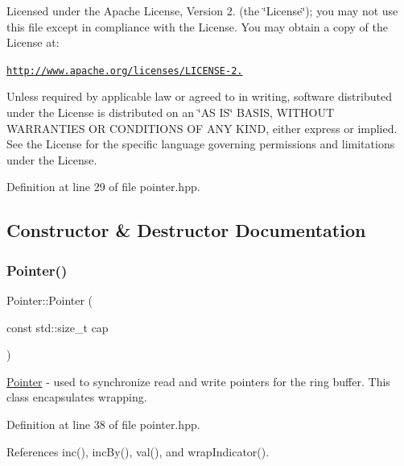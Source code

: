 Licensed under the Apache License, Version 2. (the \char`\"{}\+License\char`\"{}); you may not use this file except in compliance with the License. You may obtain a copy of the License at\+:

\href{http://www.apache.org/licenses/LICENSE-2.0}{\tt http\+://www.\+apache.\+org/licenses/\+L\+I\+C\+E\+N\+S\+E-\/2.}

Unless required by applicable law or agreed to in writing, software distributed under the License is distributed on an \char`\"{}\+A\+S I\+S\char`\"{} B\+A\+S\+IS, W\+I\+T\+H\+O\+UT W\+A\+R\+R\+A\+N\+T\+I\+ES OR C\+O\+N\+D\+I\+T\+I\+O\+NS OF A\+NY K\+I\+ND, either express or implied. See the License for the specific language governing permissions and limitations under the License. 

Definition at line 29 of file pointer.\+hpp.



\subsection{Constructor \& Destructor Documentation}
\hypertarget{class_pointer_ae124185327ebd4938437141a6aec7ede}{}\label{class_pointer_ae124185327ebd4938437141a6aec7ede} 
\subsubsection{\texorpdfstring{Pointer()}{Pointer()}\hspace{0.1cm}{\footnotesize\ttfamily [1/2]}}
{\footnotesize\ttfamily Pointer\+::\+Pointer (\begin{DoxyParamCaption}\item[{const std\+::size\+\_\+t}]{cap }\end{DoxyParamCaption})\hspace{0.3cm}{\ttfamily [inline]}}

\hyperlink{class_pointer}{Pointer} -\/ used to synchronize read and write pointers for the ring buffer. This class encapsulates wrapping. 

Definition at line 38 of file pointer.\+hpp.



References inc(), inc\+By(), val(), and wrap\+Indicator().



